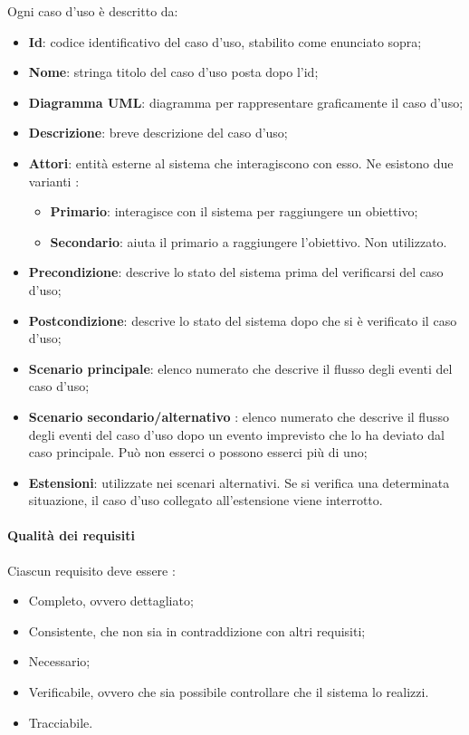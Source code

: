 Ogni caso d'uso è descritto da: 
\begin{itemize}
    \item \textbf{Id}: codice identificativo del caso d'uso, stabilito come enunciato sopra;
    \item \textbf{Nome}: stringa titolo del caso d'uso posta dopo l'id;
    \item \textbf{Diagramma UML}: diagramma per rappresentare graficamente il caso d'uso;
    \item \textbf{Descrizione}: breve descrizione del caso d'uso;
    \item \textbf{Attori}: entità esterne al sistema che interagiscono con esso. Ne esistono due varianti : 
    \begin{itemize}
    \item \textbf{Primario}: interagisce con il sistema per raggiungere un obiettivo;
    \item \textbf{Secondario}: aiuta il primario a raggiungere l'obiettivo. Non utilizzato.
    \end{itemize}
    \item \textbf{Precondizione}: descrive lo stato del sistema prima del verificarsi del caso d'uso;
    \item \textbf{Postcondizione}: descrive lo stato del sistema dopo che si è verificato il caso d'uso;
    \item \textbf{Scenario principale}: elenco numerato che descrive il flusso degli eventi del caso d'uso;
    \item \textbf{Scenario secondario/alternativo} : elenco numerato che descrive il flusso degli eventi del caso d'uso dopo un evento imprevisto che lo ha deviato dal caso principale. Può non esserci o possono esserci più di uno;
    \item \textbf{Estensioni}: utilizzate nei scenari alternativi. Se si verifica una determinata situazione, il caso d'uso collegato all'estensione viene interrotto.
\end{itemize}

\paragraph{Qualità dei requisiti}
Ciascun requisito deve essere :
\begin{itemize}
  \item Completo, ovvero dettagliato;
  \item Consistente, che non sia in contraddizione con altri requisiti;
  \item Necessario;
  \item Verificabile, ovvero che sia possibile controllare che il sistema lo realizzi.
  \item Tracciabile.
\end{itemize}



